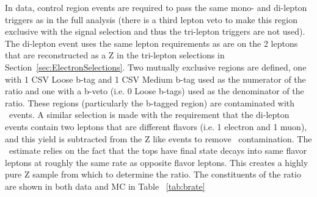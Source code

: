 In data, control region events are required to pass the same mono- and di-lepton triggers as in the full analysis (there is a third lepton veto to make this region exclusive with the signal selection and thus the tri-lepton triggers are not used). The di-lepton event uses the same lepton requirements as are on the 2 leptons that are reconstructed as a Z in the tri-lepton selections in Section~\ref{sec:ElectronSelections}. Two mutually exclusive regions are defined, one with 1 CSV Loose b-tag and 1 CSV Medium b-tag used as the numerator of the ratio and one with a b-veto (i.e. 0 Loose b-tags) used as the denominator of the ratio. These regions (particularly the b-tagged region) are contaminated with \ttbar \ events. A similar selection is made with the requirement that the di-lepton events contain two leptons that are different flavors (i.e. 1 electron and 1 muon), and this yield is subtracted from the Z like events to remove \ttbar \ contamination. The \ttbar \ estimate relies on the fact that the tops have final state decays into same flavor leptons at roughly the same rate as opposite flavor leptons. This creates a highly pure Z sample from which to determine the ratio. The constituents of the ratio are shown in both data and MC in Table ~\ref{tab:brate}

